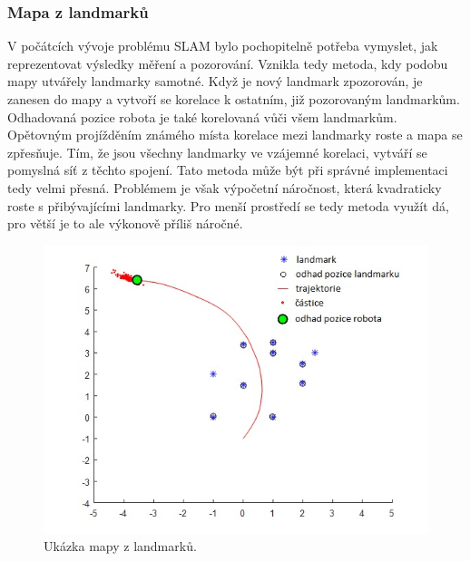 \documentclass[12pt]{report}
\begin{document}
\subsubsection{Mapa z landmarků}
V počátcích vývoje problému SLAM bylo pochopitelně potřeba vymyslet, jak reprezentovat výsledky měření a pozorování. Vznikla tedy metoda, kdy podobu mapy utvářely landmarky samotné. Když je nový landmark zpozorován, je zanesen do mapy a vytvoří se korelace k ostatním, již pozorovaným landmarkům. Odhadovaná pozice robota je také korelovaná vůči všem landmarkům. \\
\indent Opětovným projížděním známého místa korelace mezi landmarky roste a mapa se zpřesňuje. Tím, že jsou všechny landmarky ve vzájemné korelaci, vytváří se pomyslná síť z těchto spojení. Tato metoda může být při správné implementaci tedy velmi přesná. Problémem je však výpočetní náročnost, která kvadraticky roste s přibývajícími landmarky. Pro menší prostředí se tedy metoda využít dá, pro větší je to ale výkonově příliš náročné.

\begin{figure}[!ht]
	\begin{center}
		\includegraphics[width=0.7\columnwidth]{imgs/landmark_map.jpg}
	\end{center}
	\caption{Ukázka mapy z landmarků.}
	\label{fig:landmark_map}
\end{figure}
\newpage
\end{document}
